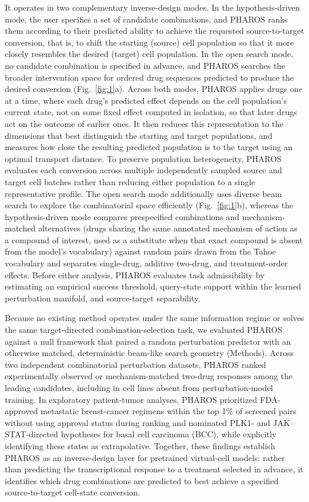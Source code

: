 \documentclass[11pt,a4paper]{article}
\begin{document}
It operates in two complementary inverse-design modes. In the hypothesis-driven mode, the user specifies a set of candidate combinations, and PHAROS ranks them according to their predicted ability to achieve the requested source-to-target conversion, that is, to shift the starting (source) cell population so that it more closely resembles the desired (target) cell population. In the open search mode, no candidate combination is specified in advance, and PHAROS searches the broader intervention space for ordered drug sequences predicted to produce the desired conversion (Fig.~\ref{fig:1}a). Across both modes, PHAROS applies drugs one at a time, where each drug's predicted effect depends on the cell population's current state, not on some fixed effect computed in isolation, so that later drugs act on the outcome of earlier ones. It then reduces this representation to the dimensions that best distinguish the starting and target populations, and measures how close the resulting predicted population is to the target using an optimal transport distance. To preserve population heterogeneity, PHAROS evaluates each conversion across multiple independently sampled source and target cell batches rather than reducing either population to a single representative profile. The open search mode additionally uses diverse beam search to explore the combinatorial space efficiently (Fig.~\ref{fig:1}b)\cite{Wold2001, Cuturi2013, Vijayakumar2018}, whereas the hypothesis-driven mode compares prespecified combinations and mechanism-matched alternatives (drugs sharing the same annotated mechanism of action as a compound of interest, used as a substitute when that exact compound is absent from the model's vocabulary) against random pairs drawn from the Tahoe vocabulary and separates single-drug, additive two-drug, and treatment-order effects. Before either analysis, PHAROS evaluates task admissibility by estimating an empirical success threshold, query-state support within the learned perturbation manifold, and source-target separability.

Because no existing method operates under the same information regime or solves the same target-directed combination-selection task, we evaluated PHAROS against a null framework that paired a random perturbation predictor with an otherwise matched, deterministic beam-like search geometry (Methods). Across two independent combinatorial perturbation datasets, PHAROS ranked experimentally observed or mechanism-matched two-drug responses among the leading candidates, including in cell lines absent from perturbation-model training. In exploratory patient-tumor analyses, PHAROS prioritized FDA-approved metastatic breast-cancer regimens within the top 1\% of screened pairs without using approval status during ranking and nominated PLK1- and JAK--STAT-directed hypotheses for basal cell carcinoma (BCC), while explicitly identifying these states as extrapolative. Together, these findings establish PHAROS as an inverse-design layer for pretrained virtual-cell models: rather than predicting the transcriptional response to a treatment selected in advance, it identifies which drug combinations are predicted to best achieve a specified source-to-target cell-state conversion.
\end{document}
